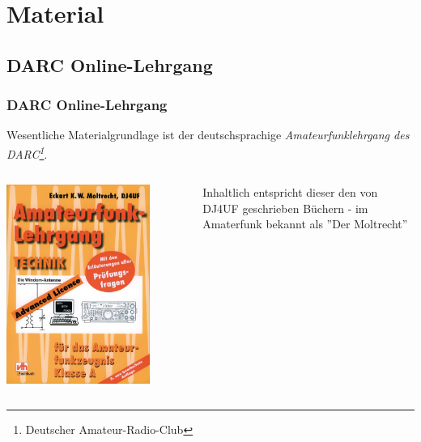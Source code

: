 \section{Material}

\subsection[DARC-Lehrgang]{DARC Online-Lehrgang}

\begin{frame}
    \frametitle{DARC Online-Lehrgang}

    Wesentliche Materialgrundlage ist der deutschsprachige
    \emph{Amateurfunklehrgang\hyperlink{refs}{\cite{darc}} des
    DARC\footnote{Deutscher Amateur-Radio-Club}}.

    \begin{columns}[c]
        \column[c]{5cm}
        \begin{center}
            \includegraphics[width=0.8\textwidth]{a00/Amateurfunklehrgang-Technik-fuer-das-Amateurfunkzeugnis-Klasse-A.jpg}
            \tiny \hyperlink{refs}{\cite{darcv}}
        \end{center}
        \column{5cm}
            Inhaltlich entspricht dieser den von DJ4UF geschrieben Büchern - im
            Amaterfunk bekannt als ''Der Moltrecht''\hyperlink{refs}{\cite{dj4uf}}
    \end{columns}

\end{frame}

